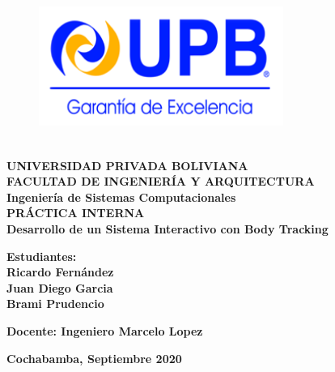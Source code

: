 \begin{titlepage}
	
	\makeatletter
	\setlength{\@fptop}{0pt}
	\makeatother
\begin{figure}[t!]
	\centering
	\includegraphics[width=8cm,height=5cm,]{./Images/Logo_Upb.png}
\end{figure}
\begin{center}
	\textbf{
		\large{UNIVERSIDAD PRIVADA BOLIVIANA\\
		FACULTAD DE INGENIERÍA Y ARQUITECTURA\\
		Ingeniería de Sistemas Computacionales\\[1cm]}
		\huge{PRÁCTICA INTERNA}\\[2cm]
		\Huge{Desarrollo de un Sistema Interactivo con Body Tracking}
	}\\[3cm]
\end{center} 
\textbf{Estudiantes: \\}
\textbf{
		Ricardo Fernández\\
		Juan Diego Garcia\\
		Brami Prudencio\\[1cm]
	}
\begin{center}
		\textbf{
		Docente:
		Ingeniero Marcelo Lopez\\[2cm]
	}
\end{center} 
	\begin{center}
		\textbf{Cochabamba, Septiembre 2020}
	\end{center}

\end{titlepage}